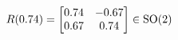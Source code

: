 \documentclass[preview]{standalone}
\begin{document}
\begin{align*}
\special{dvisvgm:raw <g id='unique000'>}R(0.74) = \begin{bmatrix} 0.74 & -0.67 \\ 0.67 & 0.74 \end{bmatrix} \in \text{SO}(2)\special{dvisvgm:raw </g>}
\end{align*}
\end{document}
